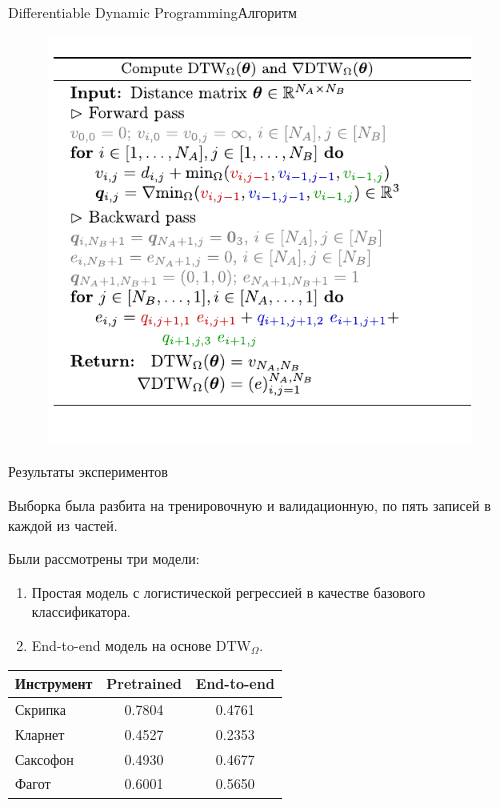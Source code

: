 \documentclass[unicode, dvipsnames]{beamer}
\begin{document}
\begin{frame}{Differentiable Dynamic Programming}{Алгоритм}
	\begin{figure}		
		\centering
		\vspace{-0.2em}
		\includegraphics[height=0.85\textheight]{./graphics/alg.pdf}
	\end{figure}
\end{frame}


\begin{frame}{Результаты экспериментов}

Выборка была разбита на тренировочную и валидационную, по пять записей в каждой из частей.

\bigskip
Были рассмотрены три модели: 
\begin{enumerate}
	\item Простая модель с логистической регрессией в качестве базового классификатора.
	\item End-to-end модель на основе $\mathrm{DTW}_\Omega$.
\end{enumerate}

\bigskip
\centering
\begin{tabular}{|l|c|c|}
	\hline
	Инструмент & Pretrained & End-to-end \\
	\hline
	Скрипка & 0.7804 & 0.4761 \\
	\hline
	Кларнет & 0.4527 & 0.2353 \\
	\hline
	Саксофон & 0.4930 & 0.4677 \\
	\hline
	Фагот & 0.6001 & 0.5650 \\
	\hline
\end{tabular}

\end{frame}
\end{document}
